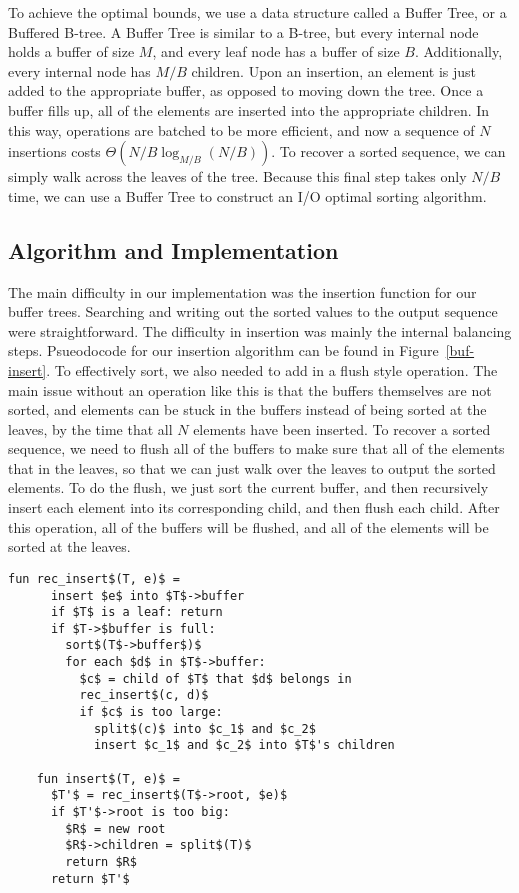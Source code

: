 \documentclass{article}
\begin{document}
To achieve the optimal bounds, we use a data structure called
a Buffer Tree, or a Buffered B-tree.
%
A Buffer Tree is similar to a B-tree, but every internal node
holds a buffer of size $M$, and every leaf node has a buffer
of size $B$.
%
Additionally, every internal node has $M/B$ children.
%
Upon an insertion, an element is just added to the appropriate buffer,
as opposed to moving down the tree.
%
Once a buffer fills up, all of the elements are inserted into the appropriate
children.
%
In this way, operations are batched to be more efficient, and now a sequence
of $N$ insertions costs $\Theta(N/B \log_{M/B}(N/B))$.
%
To recover a sorted sequence, we can simply walk across the leaves of the tree.
%
Because this final step takes only $N/B$ time, we can use a Buffer Tree
to construct an I/O optimal sorting algorithm.

\subsection{Algorithm and Implementation}
The main difficulty in our implementation was the insertion function
for our buffer trees.
%
Searching and writing out the sorted values to the output sequence
were straightforward.
%
The difficulty in insertion was mainly the internal balancing steps.
%
Psueodocode for our insertion algorithm can be found in Figure~\ref{buf-insert}.
%
To effectively sort, we also needed to add in a flush style operation.
%
The main issue without an operation like this is that the buffers themselves
are not sorted, and elements can be stuck in the buffers instead of being sorted
at the leaves, by the time that all $N$ elements have been inserted.
%
To recover a sorted sequence, we need to flush all of the buffers to
make sure that all of the elements that in the leaves, so that we can just walk
over the leaves to output the sorted elements.
%
To do the flush, we just sort the current buffer, and then recursively insert each
element into its corresponding child, and then flush each child.
%
After this operation, all of the buffers will be flushed, and all of the elements will
be sorted at the leaves.




\begin{figure*}

  \begin{lstlisting}[mathescape=true]
    fun rec_insert$(T, e)$ =
      insert $e$ into $T$->buffer
      if $T$ is a leaf: return
      if $T->$buffer is full:
        sort$(T$->buffer$)$
        for each $d$ in $T$->buffer:
          $c$ = child of $T$ that $d$ belongs in
          rec_insert$(c, d)$
          if $c$ is too large:
            split$(c)$ into $c_1$ and $c_2$
            insert $c_1$ and $c_2$ into $T$'s children

    fun insert$(T, e)$ =
      $T'$ = rec_insert$(T$->root, $e)$
      if $T'$->root is too big:
        $R$ = new root
        $R$->children = split$(T)$
        return $R$
      return $T'$
  \end{lstlisting}
  \caption{Buffer Tree insertion algorithm}
  \label{buf-insert}
\end{figure*}
\end{document}
